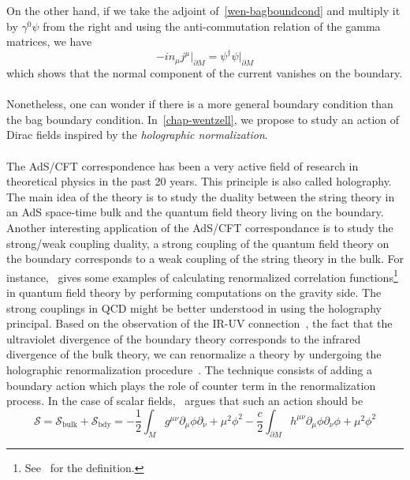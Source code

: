 On the other hand, if we take the adjoint of~\cref{wen-bagboundcond} and multiply it by $\gamma^0\psi$ from the right and using the anti-commutation relation of the gamma matrices, we have
\begin{equation*}
- i n_\mu j^\mu \big\vert_{\partial M} = \psi^\dagger\psi\big\vert_{\partial M}
\end{equation*}
which shows that the normal component of the current vanishes on the boundary. \\\\
Nonetheless, one can wonder if there is a more general boundary condition than the bag boundary condition. 
In~\cref{chap-wentzell}, we propose to study an action of Dirac fields inspired by the \textit{holographic normalization}. \\\\
%
The AdS/CFT correspondence has been a very active field of research in theoretical physics in the past 20 years. 
This principle is also called holography.
The main idea of the theory is to study the duality between the string theory in an AdS space-time bulk and the quantum field theory living on the boundary.
Another interesting application of the AdS/CFT correspondance is to study the strong/weak coupling duality, \ie
a strong coupling of the quantum field theory on the boundary corresponds to a weak coupling of the string theory in the bulk. 
For instance,~\cite{Skenderis2002} gives some examples of calculating renormalized correlation functions\footnote{
See~\eg\cite{Peskin1995} for the definition.
} in quantum field theory by performing computations on the gravity side.
The strong couplings in QCD might be better understood in using the holography principal. 
Based on the observation of the IR-UV connection~\cite{Susskind1998}, 
\ie the fact that the ultraviolet divergence of the boundary theory corresponds to the infrared divergence of the bulk theory, 
we can renormalize a theory by undergoing the holographic renormalization procedure~\cite{Skenderis2002}. 
The technique consists of adding a boundary action which plays the role of counter term in the renormalization process.
In the case of scalar fields,~\cite{Skenderis2002} argues that such an action should be
\begin{equation*}
\mathcal{S} = \mathcal{S}_{\mathrm{bulk}} + \mathcal{S}_{\mathrm{bdy}} = 
-\frac 1 2 \int_M g^{\mu\nu} \partial_\mu \phi \partial_{\nu} + 
\mu^2\phi^2 - \frac c 2 \int_{\partial M}h^{\mu\nu}\partial_\mu\phi\partial_\nu\phi + \mu^2\phi^2
\end{equation*}
